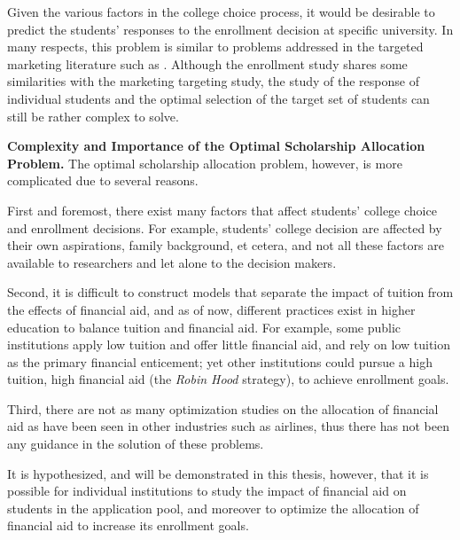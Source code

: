 \documentclass[12pt,english]{report}
\begin{document}
Given the various factors in the college choice process, it would be 
desirable to predict the students' responses to the enrollment decision 
at specific university.  In many respects, this problem is similar to 
problems addressed in the targeted marketing literature such as 
\citep{Reinartz2003}. Although the enrollment study shares
some similarities with the marketing targeting study,  the study of 
the response of individual students and the optimal 
selection of the target set of students can still be rather complex to 
solve.


\vspace*{.15in} 
\noindent \textbf{Complexity and Importance of the Optimal Scholarship Allocation Problem.}
The optimal scholarship allocation problem, however, is more complicated due 
to several reasons. 

First and foremost, there exist many factors that affect students' college 
choice and enrollment decisions. For example, students' college decision are 
affected by their own aspirations, family background, et cetera, and not all 
these factors are available to researchers and let alone to the decision makers. %

Second, it is difficult to construct models that separate the impact of 
tuition from the effects of financial aid, and as 
of now, different practices exist in higher education to balance tuition 
and financial aid. For example, some public institutions apply low 
tuition and offer little financial aid, and rely on low tuition as the 
primary financial enticement; yet other institutions could pursue a high 
tuition, high financial aid (the \textit{Robin Hood} strategy), to 
achieve enrollment goals.

Third, there are not as many optimization studies on the allocation of 
financial aid as have been seen in other industries such as airlines, thus 
there has not been any guidance in the solution of these problems. 

\vspace*{.15in}  
It is hypothesized, and will be demonstrated in this thesis, however, that it 
is possible for individual institutions  to study the impact of financial aid 
on students in the application pool, and moreover to optimize the allocation 
of financial aid to increase its enrollment goals. 
\end{document}
